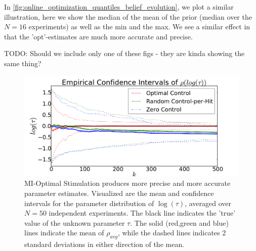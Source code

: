 \documentclass{article}
\begin{document}
In \cref{fig:online_optimization_quantiles_belief_evolution}, we plot a similar
illustration, here we show the median of the mean of the prior (median over the
$N=16$ experiments) as well as the min and the max. We see a similar effect in
that the 'opt'-estimates are much more accurate and precise. 

TODO: Should we include only one of these figs - they are kinda showing the
same thing?
 
\begin{figure}[htp]
\begin{center}
  \includegraphics[width=\textwidth]{Figs/HTOnlineEstimator/online_updated_prior_mean_aggregated_ensemble.pdf}
  \caption[MI-Optimal Stimulation produces more precise parameter estimates]
  {MI-Optimal Stimulation produces more precise and more accurate parameter
  estimates. Visualized are the mean and confidence intervals for the parameter
  distribution of $\log (\tau)$, averaged over $N=50$ independent
  experiments. The black line indicates the 'true' value of the unknown parameter $\tau$.
  The solid (red,green and blue) lines indicate the mean of $\rho_{avg}$, while
  the dashed lines indicates 2 standard deviations in either direction of the
  mean. }  
  \label{fig:online_optimization_aggregated_belief_evolution}
\end{center}
\end{figure}
\end{document}
